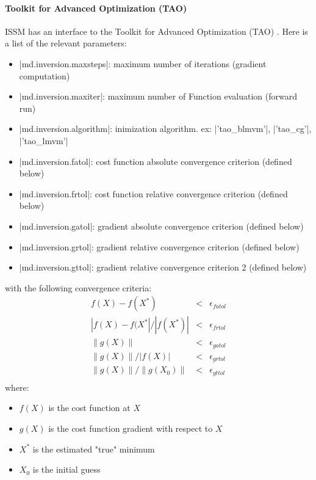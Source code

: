 \paragraph{Toolkit for Advanced Optimization (TAO)}%
ISSM has an interface to the Toolkit for Advanced Optimization (TAO) \citep{Munson2012}. Here is a list of the relevant parameters:
\begin{itemize}
	\item \lstinlinebg|md.inversion.maxsteps|: maximum number of iterations (gradient computation)
	\item \lstinlinebg|md.inversion.maxiter|: maximum number of Function evaluation (forward run)
	\item \lstinlinebg|md.inversion.algorithm|: inimization algorithm. ex: \lstinlinebg|'tao_blmvm'|, \lstinlinebg|'tao_cg'|, \lstinlinebg|'tao_lmvm'|
	\item \lstinlinebg|md.inversion.fatol|: cost function absolute convergence criterion (defined below)
	\item \lstinlinebg|md.inversion.frtol|: cost function relative convergence criterion (defined below)
	\item \lstinlinebg|md.inversion.gatol|: gradient absolute convergence criterion (defined below)
	\item \lstinlinebg|md.inversion.grtol|: gradient relative convergence criterion (defined below)
	\item \lstinlinebg|md.inversion.gttol|: gradient relative convergence criterion 2 (defined below)
\end{itemize}
with the following convergence criteria:
\begin{equation}
	\begin{array}{lcl}
		f(X) - f(X^*)                                 & < & \epsilon_{fatol} \\
		\left|f(X) - f(X^*\right|/\left|f(X^*)\right| & < & \epsilon_{frtol} \\
		\|g(X)\|                                      & < & \epsilon_{gatol} \\
		\|g(X)\|/\left|f(X)\right|                    & < & \epsilon_{grtol} \\
		\|g(X)\|/\|g(X_0)\|                           & < & \epsilon_{gttol} \\
	\end{array}
\end{equation}
where:
\begin{itemize}
	\item $f(X)$ is the cost function at $X$
	\item $g(X)$ is the cost function gradient with respect to $X$
	\item $X^*$ is the estimated "true" minimum
	\item $X_0$ is the initial guess
\end{itemize}

